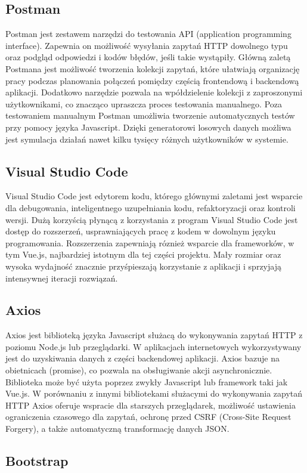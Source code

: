 \subsection{Postman}
Postman jest zestawem narzędzi do testowania API (application programming interface). Zapewnia on możliwość wysyłania zapytań HTTP dowolnego typu oraz podgląd odpowiedzi i kodów błędów, jeśli takie wystąpiły. Główną zaletą Postmana jest możliwość tworzenia kolekcji zapytań, które ułatwiają organizację pracy podczas planowania połączeń pomiędzy częścią frontendową i backendową aplikacji. Dodatkowo narzędzie pozwala na wpółdzielenie kolekcji z zaproszonymi użytkownikami, co znacząco upraszcza proces testowania manualnego. Poza testowaniem manualnym Postman umożliwia tworzenie automatycznych testów przy pomocy języka Javascript. Dzięki generatorowi losowych danych możliwa jest symulacja działań nawet kilku tysięcy różnych użytkowników w systemie.
\subsection{Visual Studio Code}
Visual Studio Code jest edytorem kodu, którego głównymi zaletami jest wsparcie dla debugowania, inteligentnego uzupełniania kodu, refaktoryzacji oraz kontroli wersji. Dużą korzyścią płynącą z korzystania z program Visual Studio Code jest dostęp do rozszerzeń, usprawniających pracę z kodem w dowolnym języku programowania. Rozszerzenia zapewniają róznież wsparcie dla frameworków, w tym Vue.js, najbardziej istotnym dla tej części projektu. Mały rozmiar oraz wysoka wydajność znacznie przyśpieszają korzystanie z aplikacji i sprzyjają intensywnej iteracji rozwiązań.
\subsection{Axios}
Axios jest biblioteką języka Javascript służacą do wykonywania zapytań HTTP z poziomu Node.js lub przeglądarki. W aplikacjach internetowych wykorzystywany jest do uzyskiwania danych z części backendowej aplikacji. Axios bazuje na obietnicach (promise), co pozwala na obsługiwanie akcji asynchronicznie. Biblioteka może być użyta poprzez zwykły Javascript lub framework taki jak Vue.js. W porównaniu z innymi bibliotekami służacymi do wykonywania zapytań HTTP Axios oferuje wspracie dla starszych przeglądarek, możliwość ustawienia ograniczenia czasowego dla zapytań, ochronę przed CSRF (Cross-Site Request Forgery), a także automatyczną transformację danych JSON.
\subsection{Bootstrap}

